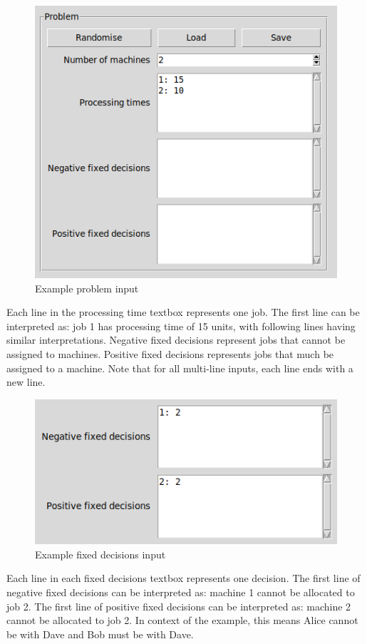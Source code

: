 \begin{figure}[H]
	\centering
	\includegraphics[scale=0.5]{figures/tool_problem.png}
	\caption{Example problem input}
\end{figure}

Each line in the processing time textbox represents one job. The first line can be interpreted as: job 1 has processing time of 15 units, with following lines having similar interpretations. Negative fixed decisions represent jobs that cannot be assigned to machines. Positive fixed decisions represents jobs that much be assigned to a machine. Note that for all multi-line inputs, each line ends with a new line.

\begin{figure}[H]
	\centering
	\includegraphics[scale=0.5]{figures/tool_fd.png}
	\caption{Example fixed decisions input}
\end{figure}

Each line in each fixed decisions textbox represents one decision. The first line of negative fixed decisions can be interpreted as: machine 1 cannot be allocated to job 2. The first line of positive fixed decisions can be interpreted as: machine 2 cannot be allocated to job 2. In context of the example, this means Alice cannot be with Dave and Bob must be with Dave.


